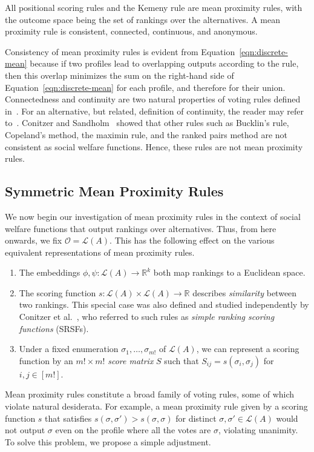 \documentclass[prodmode,acmec]{ec-acmsmall}
\newcommand{\calL}{{\mathcal{L}}}
\newcommand{\rank}{{\calL(A)}}
\newcommand{\calO}{{\mathcal{O}}}
\newcommand{\kibitz}[2]{\ifnum\Comments=1\textcolor{#1}{#2}\fi}
\newcommand{\ns}[1]{\kibitz{red} {[NS: #1]}}
\begin{document}
\begin{proposition}
All positional scoring rules and the Kemeny rule are mean proximity rules, with the outcome space being the set of rankings over the alternatives. A mean proximity rule is consistent, connected, continuous, and anonymous.
\label{prop:properties}
\end{proposition}
%
Consistency of mean proximity rules is evident from Equation~\eqref{eqn:discrete-mean} because if two profiles lead to overlapping outputs according to the rule, then this overlap minimizes the sum on the right-hand side of Equation~\eqref{eqn:discrete-mean} for each profile, and therefore for their union. Connectedness and continuity are two natural properties of voting rules defined in~\cite{Zwicker08a}. For an alternative, but related, definition of continuity, the reader may refer to~\cite{CRX09}. Conitzer and Sandholm~ showed that other rules such as Bucklin's rule, Copeland's method, the maximin rule, and the ranked pairs method are not consistent as social welfare functions. Hence, these rules are not mean proximity rules. 


\subsection{Symmetric Mean Proximity Rules}
\label{sec:symm}

We now begin our investigation of mean proximity rules in the context of social welfare functions that output rankings over alternatives. Thus, from here onwards, we fix $\calO = \rank$. This has the following effect on the various equivalent representations of mean proximity rules.
\begin{enumerate}
\item The embeddings $\phi,\psi : \rank \to \mathbb{R}^k$ both map rankings to a Euclidean space. 
\item The scoring function $s : \rank \times \rank \rightarrow \mathbb{R}$ describes \emph{similarity} between two rankings. This special case was also defined and studied independently by Conitzer et al.~, who referred to such rules as \emph{simple ranking scoring functions} (SRSFs). 
\item Under a fixed enumeration $\sigma_1,\ldots,\sigma_{m!}$ of $\rank$, we can represent a scoring function by an $m! \times m!$ \emph{score matrix} $S$ such that $S_{ij} = s(\sigma_i,\sigma_j)$ for $i,j \in [m!]$.
\end{enumerate}
%
Mean proximity rules constitute a broad family of voting rules, some of which violate natural desiderata. For example, a mean proximity rule given by a scoring function $s$ that satisfies $s(\sigma,\sigma') > s(\sigma,\sigma)$ for distinct $\sigma,\sigma' \in \rank$ would not output $\sigma$ even on the profile where all the votes are $\sigma$, violating unanimity. To solve this problem, we propose a simple adjustment. 
\end{document}
